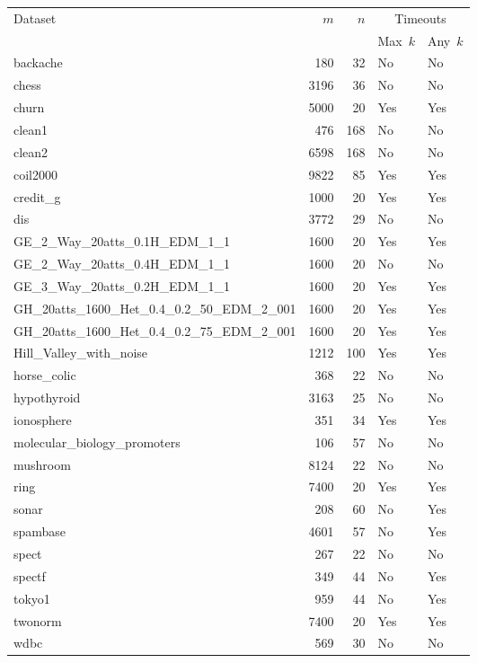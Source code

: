 \documentclass{article}
\theoremstyle{definition}
\begin{document}
\begin{table}[p]
	\centering
	\begin{tabular}{lrrll}
		\toprule
		\multirow{2}{*}{Dataset} & \multirow{2}{*}{$m$} & \multirow{2}{*}{$n$} & \multicolumn{2}{c}{Timeouts} \\
		\cmidrule(lr){4-5}
		& & & Max~$k$ & Any~$k$ \\
		\midrule
		backache & 180 & 32 & No & No \\
		chess & 3196 & 36 & No & No \\
		churn & 5000 & 20 & Yes & Yes \\
		clean1 & 476 & 168 & No & No \\
		clean2 & 6598 & 168 & No & No \\
		coil2000 & 9822 & 85 & Yes & Yes \\
		credit\_g & 1000 & 20 & Yes & Yes \\
		dis & 3772 & 29 & No & No \\
		GE\_2\_Way\_20atts\_0.1H\_EDM\_1\_1 & 1600 & 20 & Yes & Yes \\
		GE\_2\_Way\_20atts\_0.4H\_EDM\_1\_1 & 1600 & 20 & No & No \\
		GE\_3\_Way\_20atts\_0.2H\_EDM\_1\_1 & 1600 & 20 & Yes & Yes \\
		GH\_20atts\_1600\_Het\_0.4\_0.2\_50\_EDM\_2\_001 & 1600 & 20 & Yes & Yes \\
		GH\_20atts\_1600\_Het\_0.4\_0.2\_75\_EDM\_2\_001 & 1600 & 20 & Yes & Yes \\
		Hill\_Valley\_with\_noise & 1212 & 100 & Yes & Yes \\
		horse\_colic & 368 & 22 & No & No \\
		hypothyroid & 3163 & 25 & No & No \\
		ionosphere & 351 & 34 & Yes & Yes \\
		molecular\_biology\_promoters & 106 & 57 & No & No \\
		mushroom & 8124 & 22 & No & No \\
		ring & 7400 & 20 & Yes & Yes \\
		sonar & 208 & 60 & No & Yes \\
		spambase & 4601 & 57 & No & Yes \\
		spect & 267 & 22 & No & No \\
		spectf & 349 & 44 & No & Yes \\
		tokyo1 & 959 & 44 & No & Yes \\
		twonorm & 7400 & 20 & Yes & Yes \\
		wdbc & 569 & 30 & No & No \\

\end{tabular}
\end{table}
\end{document}
